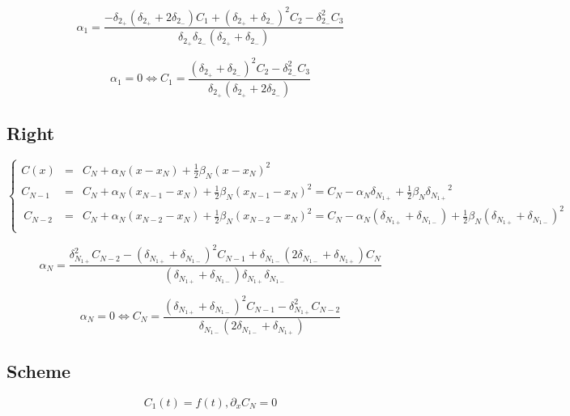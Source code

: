 \documentclass[aps,11pt]{revtex4}
\begin{document}
\begin{equation}
	\alpha_1 = \dfrac{ -\delta_{2_+}(\delta_{2_+}+2\delta_{2_-}) C_1 + (\delta_{2_+}+\delta_{2_-})^2  C_2 - \delta_{2_-}^2 C_3}{\delta_{2_+}\delta_{2_-}(\delta_{2_+}+\delta_{2_-})}
\end{equation}

\begin{equation}
	\alpha_1 = 0  \iff C_1 = \dfrac{ (\delta_{2_+}+\delta_{2_-})^2  C_2 - \delta_{2_-}^2 C_3}{\delta_{2_+}(\delta_{2_+}+2\delta_{2_-})}
\end{equation}

\subsection{Right}
\begin{equation}
\left\lbrace
\begin{array}{rcl}
	C(x)    & = & C_N + \alpha_N (x-x_N) + \frac{1}{2}\beta_N (x-x_N)^2\\
	C_{N-1} & = & C_N + \alpha_N (x_{N-1}-x_{N}) +  \frac{1}{2}\beta_N (x_{N-1}-x_{N}) ^2 = C_N - \alpha_N {\delta_{N_{1+}}} +  \frac{1}{2}\beta_N {\delta_{N_{1+}}}^2\\\
	C_{N-2} & = & C_N + \alpha_N (x_{N-2}-x_{N}) +  \frac{1}{2}\beta_N (x_{N-2}-x_{N}) ^2 = C_N - \alpha_N (\delta_{N_{1+}}+\delta_{N_{1-}}) + \frac{1}{2}\beta_N (\delta_{N_{1+}}+\delta_{N_{1-}})^2\\
\end{array}
\right.
\end{equation}

\begin{equation}
	\alpha_N = \dfrac{\delta_{N_{1+}}^2C_{N-2} - (\delta_{N_{1+}}+\delta_{N_{1-}})^2 C_{N-1} + \delta_{N_{1-}}(2\delta_{N_{1-}}+\delta_{N_{1+}}) C_N }{(\delta_{N_{1+}}+\delta_{N_{1-}})\delta_{N_{1+}}\delta_{N_{1-}}}
\end{equation}

\begin{equation}
	\alpha_N = 0 \iff C_N = \dfrac{(\delta_{N_{1+}}+\delta_{N_{1-}})^2 C_{N-1} - \delta_{N_{1+}}^2C_{N-2}}{\delta_{N_{1-}}(2\delta_{N_{1-}}+\delta_{N_{1+}}) }
\end{equation}

\subsection{Scheme}

\begin{equation}
C_1(t) = f(t), \partial_x C_N = 0
\end{equation}	
\end{document}
